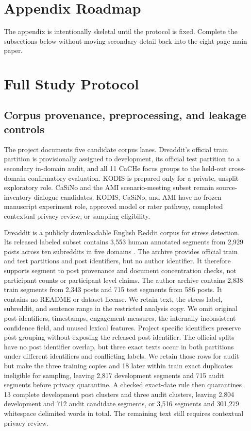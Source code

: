 \section{Appendix Roadmap}

The appendix is intentionally skeletal until the protocol is fixed. Complete the subsections below without moving secondary detail back into the eight page main paper.

\section{Full Study Protocol}

\subsection{Corpus provenance, preprocessing, and leakage controls}
\label{sec:corpora_controls}
The project documents five candidate corpus lanes. Dreaddit's official train
partition is provisionally assigned to development, its official test partition
to a secondary in-domain audit, and all 11 CaCHe focus groups to the
held-out cross-domain confirmatory evaluation. KODIS is prepared only for a
private, unsplit exploratory role. CaSiNo and the AMI scenario-meeting subset
remain source-inventory dialogue candidates. KODIS, CaSiNo, and AMI have no
frozen manuscript experiment role, approved model or rater pathway, completed
contextual privacy review, or sampling eligibility.

Dreaddit is a publicly downloadable English Reddit corpus for stress detection. Its released labeled subset contains 3,553 human annotated segments from 2,929 posts across ten subreddits in five domains \citep{turcan2019dreaddit}. The archive provides official train and test partitions and post identifiers, but no author identifier. It therefore supports segment to post provenance and document concentration checks, not participant counts or participant level claims. The author archive contains 2,838 train segments from 2,343 posts and 715 test segments from 586 posts. It contains no README or dataset license. We retain text, the stress label, subreddit, and sentence range in the restricted analysis copy. We omit original post identifiers, timestamps, engagement measures, the internally inconsistent confidence field, and unused lexical features. Project specific identifiers preserve post grouping without exposing the released post identifier. The official splits have no post identifier overlap, but three exact texts occur in both partitions under different identifiers and conflicting labels. We retain those rows for audit but make the three training copies and 18 later within train exact duplicates ineligible for sampling, leaving 2,817 development segments and 715 audit segments before privacy quarantine. A checked exact-date rule then quarantines 13 complete development post clusters and three audit clusters, leaving 2,804 development and 712 audit candidate segments, or 3,516 segments and 301,279 whitespace delimited words in total. The remaining text still requires contextual privacy review.

